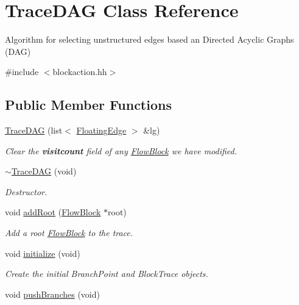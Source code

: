 \hypertarget{class_trace_d_a_g}{}\section{Trace\+D\+AG Class Reference}
\label{class_trace_d_a_g}


Algorithm for selecting unstructured edges based an Directed Acyclic Graphs (D\+AG)  




{\ttfamily \#include $<$blockaction.\+hh$>$}

\subsection*{Public Member Functions}
\begin{DoxyCompactItemize}
\item 
\mbox{\hyperlink{class_trace_d_a_g_adc523c94f57b57f19832a0080d478c7b}{Trace\+D\+AG}} (list$<$ \mbox{\hyperlink{class_floating_edge}{Floating\+Edge}} $>$ \&lg)
\begin{DoxyCompactList}\small\item\em Clear the {\bfseries{visitcount}} field of any \mbox{\hyperlink{class_flow_block}{Flow\+Block}} we have modified. \end{DoxyCompactList}\item 
\mbox{\hyperlink{class_trace_d_a_g_a353ced99fd604015d988682b915296d9}{$\sim$\+Trace\+D\+AG}} (void)
\begin{DoxyCompactList}\small\item\em Destructor. \end{DoxyCompactList}\item 
void \mbox{\hyperlink{class_trace_d_a_g_a1bfbd6888e04cc4688510f67464d8c89}{add\+Root}} (\mbox{\hyperlink{class_flow_block}{Flow\+Block}} $\ast$root)
\begin{DoxyCompactList}\small\item\em Add a root \mbox{\hyperlink{class_flow_block}{Flow\+Block}} to the trace. \end{DoxyCompactList}\item 
void \mbox{\hyperlink{class_trace_d_a_g_a6d28fcd17f9782ecb53d790bf2b4264c}{initialize}} (void)
\begin{DoxyCompactList}\small\item\em Create the initial Branch\+Point and Block\+Trace objects. \end{DoxyCompactList}\item 
void \mbox{\hyperlink{class_trace_d_a_g_a31c7a68e8e3380ff8b0d4a7af00cf2e4}{push\+Branches}} (void)

\end{DoxyCompactItemize}
